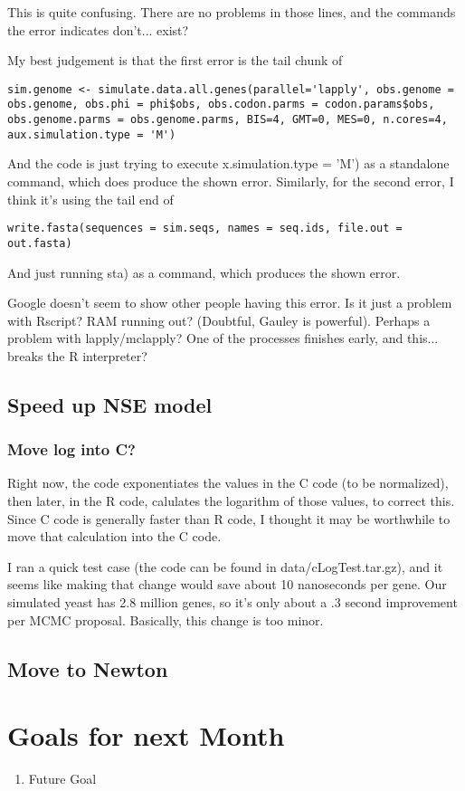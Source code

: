 This is quite confusing. There are no problems in those lines, and the commands the error indicates don't... exist?

My best judgement is that the first error is the tail chunk of
\begin{verbatim}
sim.genome <- simulate.data.all.genes(parallel='lapply', obs.genome = obs.genome, obs.phi = phi$obs, obs.codon.parms = codon.params$obs, obs.genome.parms = obs.genome.parms, BIS=4, GMT=0, MES=0, n.cores=4, aux.simulation.type = 'M')
\end{verbatim}

And the code is just trying to execute x.simulation.type = 'M') as a standalone command, which does produce the shown error. Similarly, for the second error, I think it's using the tail end of

\begin{verbatim}
write.fasta(sequences = sim.seqs, names = seq.ids, file.out = out.fasta)
\end{verbatim}

And just running sta) as a command, which produces the shown error.

Google doesn't seem to show other people having this error. Is it just a problem with Rscript? RAM running out? (Doubtful, Gauley is powerful). Perhaps a problem with lapply/mclapply? One of the processes finishes early, and this... breaks the R interpreter?


\subsection{Speed up NSE model}

\subsubsection{Move log into C?}

Right now, the code exponentiates the values in the C code (to be normalized), then later, in the R code, calulates the logarithm of those values, to correct this. Since C code is generally faster than R code, I thought it may be worthwhile to move that calculation into the C code.

I ran a quick test case (the code can be found in data/cLogTest.tar.gz), and it seems like making that change would save about 10 nanoseconds per gene. Our simulated yeast has 2.8 million genes, so it's only about a .3 second improvement per MCMC proposal. Basically, this change is too minor.

\subsection{Move to Newton}





\section{Goals for next Month}
\begin{enumerate}
\item Future Goal
\end{enumerate}


